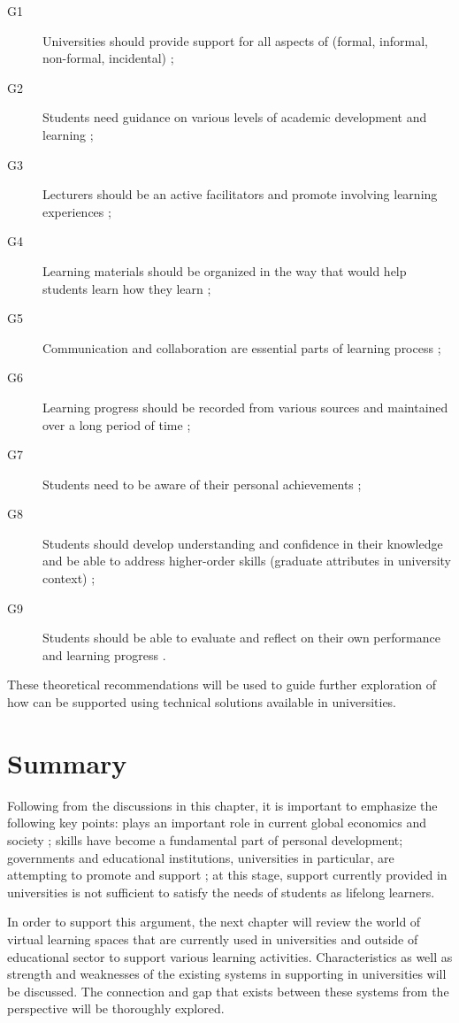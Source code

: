 \begin{description}
  \item[G1] Universities should provide support for all aspects of \LLLs
  (formal, informal, non-formal, incidental) \citep{Attwell2007, Smidt2011};
  \item[G2] Students need guidance on various levels of academic development and
  learning \citep{Leone2019};
  \item[G3] Lecturers should be an active facilitators and promote involving
  learning experiences \citep{Leone2019}; 
  \item[G4] Learning materials should be organized in the way that would help
students learn how they learn \citep{Medel-Anonuevo2001};
  \item[G5] Communication and collaboration are essential parts of learning
  process \citep{Schaffert2008};
  \item[G6] Learning progress should be recorded from various sources and
  maintained over a long period of time \citep{Kay2008};
  \item[G7] Students need to be aware of their personal achievements
\citep{Schuetze2006};
  \item[G8] Students should develop understanding and confidence in their
  knowledge and be able to address higher-order skills (graduate attributes in university
  context) \citep{Hart1999};
  \item[G9] Students should be able to evaluate and reflect on their own
  performance and learning progress \citep{Mourtos2003}.
\end{description} 

These theoretical recommendations will be used to guide further exploration of
 how \LLLs can be supported using technical solutions available in universities.

\section{Summary} 

Following from the discussions in this chapter, it is important to emphasize
the following key points: \LLLs plays an important role in current global
economics and society
\citep{Jarvis2008,Simmons-McDonald2009,InternationalLabourOffice2008}; \LLLs
skills have become a fundamental part of personal development; governments and
educational institutions, universities in particular, are attempting to promote
and support \LLLsn; at this stage, \LLLs support currently provided in
universities is not sufficient to satisfy the needs of students as lifelong
learners.

In order to support this argument, the next chapter will review the world of
virtual learning spaces that are currently used in universities and outside of
educational sector to support various learning activities. Characteristics as
well as strength and weaknesses of the existing systems in supporting \LLLs
in universities will be discussed. The connection and gap that exists between
these systems from the \LLLs perspective will be thoroughly explored.
